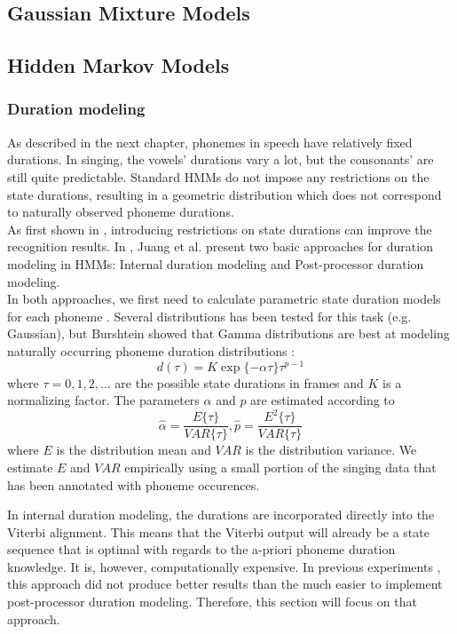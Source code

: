 \subsection{Gaussian Mixture Models}
\subsection{Hidden Markov Models}

\subsubsection{Duration modeling}
As described in the next chapter, phonemes in speech have relatively fixed durations. In singing, the vowels' durations vary a lot, but the consonants' are still quite predictable. Standard HMMs do not impose any restrictions on the state durations, resulting in a geometric distribution which does not correspond to naturally observed phoneme durations. \\
As first shown in \cite{ferguson}, introducing restrictions on state durations can improve the recognition results. In \cite{juang}, Juang et al. present two basic approaches for duration modeling in HMMs: Internal duration modeling and Post-processor duration modeling.\\
In both approaches, we first need to calculate parametric state duration models for each phoneme \cite{levinson}. Several distributions has been tested for this task (e.g. Gaussian), but Burshtein showed that Gamma distributions are best at modeling naturally occurring phoneme duration distributions \cite{burshtein}:
\begin{equation}\label{eq:d}
d(\tau) = K \exp \{ - \alpha \tau \} \tau^{p-1}
\end{equation}
where $\tau = 0,1,2,...$ are the possible state durations in frames and $K$ is a normalizing factor. The parameters $\alpha$ and $p$ are estimated according to
\begin{equation}
\hat{\alpha} = \frac{E \{\tau\}}{VAR\{\tau\}} , \hat{p} = \frac{E^{2} \{\tau\}}{VAR\{\tau\}}
\end{equation}
where $E$ is the distribution mean and $VAR$ is the distribution variance. We estimate $E$ and $VAR$ empirically using a small portion of the singing data that has been annotated with phoneme occurences.

In internal duration modeling, the durations are incorporated directly into the Viterbi alignment. This means that the Viterbi output will already be a state sequence that is optimal with regards to the a-priori phoneme duration knowledge. It is, however, computationally expensive. In previous experiments \cite{kruspe_kws2}, this approach did not produce better results than the much easier to implement post-processor duration modeling. Therefore, this section will focus on that approach.\\


